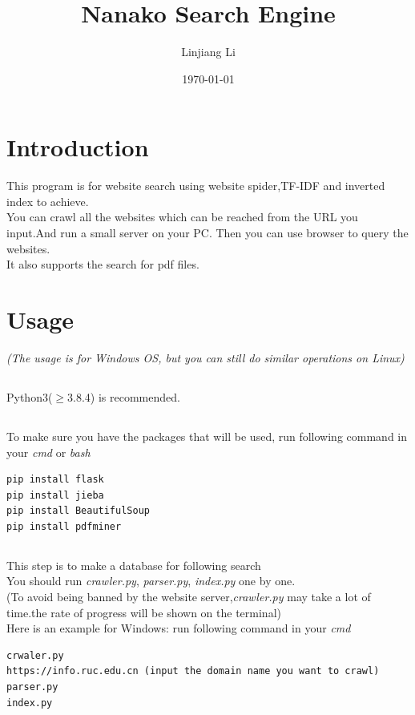 \documentclass{article}
\title{Nanako Search Engine}
\author{Linjiang Li}
\date{\today}
\begin{document}
 \maketitle
\section{Introduction}
		This program is for website search using website spider,TF-IDF and inverted index to achieve.\\ 
\indent You can crawl all the websites which can be reached from the URL you input.And run a small server on your PC. Then you can use browser to query the websites.\\
\indent It also supports the search for pdf files.
\section{Usage}
\emph{(The usage is for Windows OS, but you can still do similar operations on Linux)}
\subsection{}
	Python3($\geq$3.8.4) is recommended.

\subsection{}
To make sure you have the packages that will be used, run following command in your \emph{cmd} or \emph{bash}
\begin{lstlisting}
pip install flask
pip install jieba
pip install BeautifulSoup
pip install pdfminer
\end{lstlisting}

\subsection{}
This step is to make a database for following search\\
\indent You should run \emph{crawler.py}, \emph{parser.py}, \emph{index.py} one by one.\\
\indent (To avoid being banned by the website server,\emph{crawler.py} may take a lot of time.the rate of progress will be shown on the terminal)\\
\indent Here is an example for Windows: run following command in your \emph{cmd}
\begin{lstlisting}
crwaler.py
https://info.ruc.edu.cn (input the domain name you want to crawl)
parser.py
index.py
\end{lstlisting}
\end{document}
